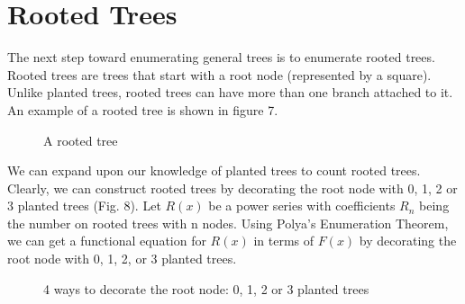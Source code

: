 \documentclass{article}
\begin{document}
\section{Rooted Trees}
The next step toward enumerating general trees is to enumerate rooted trees. Rooted trees are trees that start with a root node (represented by a square). Unlike planted trees, rooted trees can have more than one branch attached to it. An example of a rooted tree is shown in figure 7.

\begin{figure}
\centering
{}
\caption{A rooted tree}
\end{figure}

We can expand upon our knowledge of planted trees to count rooted trees. Clearly, we can construct rooted trees by decorating the root node with 0, 1, 2 or 3 planted trees (Fig. 8). Let \(R(x)\) be a power series with coefficients \(R_n\) being the number on rooted trees with n nodes. Using Polya's Enumeration Theorem, we can get a functional equation for \(R(x)\) in terms of \(F(x)\) by decorating the root node with 0, 1, 2, or 3 planted trees. 

\begin{figure}[h]
\centering
{}
\caption{4 ways to decorate the root node: 0, 1, 2  or 3 planted trees}
\end{figure}
\end{document}
